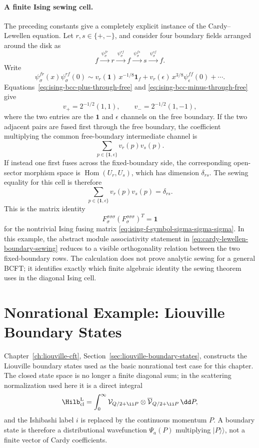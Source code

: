 \paragraph{A finite Ising sewing cell.}
The preceding constants give a completely explicit instance of the
Cardy--Lewellen equation.  Let \(r,s\in\{+,-\}\), and consider four boundary
fields arranged around the disk as
\[
  f\xrightarrow{\ \psi_\sigma^{fr}\ }r
  \xrightarrow{\ \psi_\sigma^{rf}\ }f
  \xrightarrow{\ \psi_\sigma^{fs}\ }s
  \xrightarrow{\ \psi_\sigma^{sf}\ }f .
\]
Write
\[
  \psi_\sigma^{fr}(x)\psi_\sigma^{rf}(0)
  \sim
  v_r(\mathbf 1)\,x^{-1/8}\mathbf 1_f
  +
  v_r(\epsilon)\,x^{3/8}\psi_\epsilon^{ff}(0)+\cdots .
\]
Equations~\eqref{eq:ising-bcc-plus-through-free} and
\eqref{eq:ising-bcc-minus-through-free} give
\[
  v_+=2^{-1/2}(1,1),\qquad
  v_-=2^{-1/2}(1,-1),
\]
where the two entries are the \(\mathbf 1\) and \(\epsilon\) channels on the
free boundary.  If the two adjacent pairs are fused first through the free
boundary, the coefficient multiplying the common free-boundary intermediate
channel is
\[
  \sum_{p\in\{\mathbf 1,\epsilon\}} v_r(p)v_s(p).
\]
If instead one first fuses across the fixed-boundary side, the corresponding
open-sector morphism space is \(\operatorname{Hom}(U_r,U_s)\), which has
dimension \(\delta_{rs}\).  The sewing equality for this cell is therefore
\begin{equation}
  \sum_{p\in\{\mathbf 1,\epsilon\}} v_r(p)v_s(p)=\delta_{rs}.
  \label{eq:ising-boundary-four-point-sewing-cell}
\end{equation}
This is the matrix identity
\[
  F_{\sigma}^{\sigma\sigma\sigma}
  \left(F_{\sigma}^{\sigma\sigma\sigma}\right)^{T}
  =
  \mathbf 1
\]
for the nontrivial Ising fusing matrix
\eqref{eq:ising-f-symbol-sigma-sigma-sigma}.  In this example, the
abstract module associativity statement in
\eqref{eq:cardy-lewellen-boundary-sewing} reduces to a visible orthogonality
relation between the two fixed-boundary rows.  The calculation does not prove
analytic sewing for a general BCFT; it identifies exactly which finite
algebraic identity the sewing theorem uses in the diagonal Ising cell.

\section{Nonrational Example: Liouville Boundary States}
\label{sec:bcft-liouville-boundary-states}

Chapter~\ref{ch:liouville-cft}, Section~\ref{sec:liouville-boundary-states},
constructs the Liouville boundary states used as the basic nonrational test
case for this chapter.  The closed state space is no longer a finite
diagonal sum; in the scattering normalization used here it is a direct integral
\[
  \Hilb_{\mathrm{cl}}^{\mathrm{L}}
  =
  \int_0^\infty
  \mathcal V_{Q/2+\ii P}\otimes
  \overline{\mathcal V}_{Q/2+\ii P}\,\dd P ,
\]
and the Ishibashi label \(i\) is replaced by the continuous momentum
\(P\).  A boundary state is therefore a distributional wavefunction
\(\Psi_a(P)\) multiplying \(|P\rangle\!\rangle\), not a finite vector of
Cardy coefficients.

